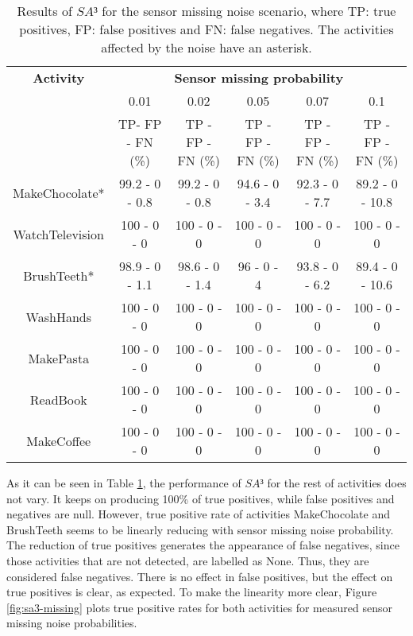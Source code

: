 \begin{table}[htbp]\scriptsize
  \begin{center}
        \begin{tabular}{cccccc}
            \hline            
            \textbf{Activity} & \multicolumn{5}{c}{\textbf{Sensor missing probability}}\\
             & 0.01 & 0.02 & 0.05 & 0.07 & 0.1 \\
             & TP- FP - FN (\%) & TP - FP - FN (\%) & TP - FP - FN (\%) & TP - FP - FN (\%) & TP - FP - FN (\%)\\
            \hline
            MakeChocolate*   & 99.2 - 0 - 0.8 & 99.2 - 0 - 0.8 & 94.6 - 0 - 3.4 & 92.3 - 0 - 7.7 & 89.2 - 0 - 10.8 \\
	    WatchTelevision  & 100 - 0 - 0 & 100 - 0 - 0 & 100 - 0 - 0 & 100 - 0 - 0 & 100 - 0 - 0 \\
	    BrushTeeth*      & 98.9 - 0 - 1.1 & 98.6 - 0 - 1.4 & 96 - 0 - 4 & 93.8 - 0 - 6.2 & 89.4 - 0 - 10.6 \\
	    WashHands        & 100 - 0 - 0 & 100 - 0 - 0 & 100 - 0 - 0 & 100 - 0 - 0 & 100 - 0 - 0 \\
	    MakePasta        & 100 - 0 - 0 & 100 - 0 - 0 & 100 - 0 - 0 & 100 - 0 - 0 & 100 - 0 - 0 \\
	    ReadBook         & 100 - 0 - 0 & 100 - 0 - 0 & 100 - 0 - 0 & 100 - 0 - 0 & 100 - 0 - 0 \\
	    MakeCoffee       & 100 - 0 - 0 & 100 - 0 - 0 & 100 - 0 - 0 & 100 - 0 - 0 & 100 - 0 - 0 \\
            \hline
        \end{tabular}                
        \caption{Results of $SA³$ for the sensor missing noise scenario, where TP: true positives, FP: false positives and FN: false negatives. The activities affected by the noise have an asterisk.}
        \label{tab-sa3-missing}
    \end{center}
\end{table}

As it can be seen in Table \ref{tab-sa3-missing}, the performance of $SA³$ for the rest of activities does not vary. It keeps on producing 100\% of true positives, while false positives and negatives are null. However, true positive rate of activities MakeChocolate and BrushTeeth seems to be linearly reducing with sensor missing noise probability. The reduction of true positives generates the appearance of false negatives, since those activities that are not detected, are labelled as None. Thus, they are considered false negatives. There is no effect in false positives, but the effect on true positives is clear, as expected. To make the linearity more clear, Figure \ref{fig:sa3-missing} plots true positive rates for both activities for measured sensor missing noise probabilities. 

